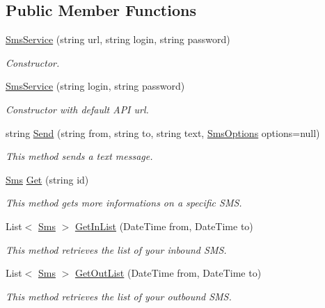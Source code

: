 \subsection*{Public Member Functions}
\begin{DoxyCompactItemize}
\item 
\hyperlink{class_thecallr_api_1_1_services_1_1_client_1_1_sms_service_a07f4ba5167b9fc91d173b3d600bdfe1a}{Sms\+Service} (string url, string login, string password)
\begin{DoxyCompactList}\small\item\em Constructor. \end{DoxyCompactList}\item 
\hyperlink{class_thecallr_api_1_1_services_1_1_client_1_1_sms_service_affcea6a4058f3282593b099529b6cf27}{Sms\+Service} (string login, string password)
\begin{DoxyCompactList}\small\item\em Constructor with default A\+P\+I url. \end{DoxyCompactList}\item 
string \hyperlink{class_thecallr_api_1_1_services_1_1_client_1_1_sms_service_ac6b2841312fb583b870d0581e430f9bc}{Send} (string from, string to, string text, \hyperlink{class_thecallr_api_1_1_objects_1_1_sms_1_1_sms_options}{Sms\+Options} options=null)
\begin{DoxyCompactList}\small\item\em This method sends a text message. \end{DoxyCompactList}\item 
\hyperlink{class_thecallr_api_1_1_objects_1_1_sms_1_1_sms}{Sms} \hyperlink{class_thecallr_api_1_1_services_1_1_client_1_1_sms_service_ae250c29e8143c86e1d7ed284c0234b84}{Get} (string id)
\begin{DoxyCompactList}\small\item\em This method gets more informations on a specific S\+M\+S. \end{DoxyCompactList}\item 
List$<$ \hyperlink{class_thecallr_api_1_1_objects_1_1_sms_1_1_sms}{Sms} $>$ \hyperlink{class_thecallr_api_1_1_services_1_1_client_1_1_sms_service_accf8d810353bcc318a2968368c56469b}{Get\+In\+List} (Date\+Time from, Date\+Time to)
\begin{DoxyCompactList}\small\item\em This method retrieves the list of your inbound S\+M\+S. \end{DoxyCompactList}\item 
List$<$ \hyperlink{class_thecallr_api_1_1_objects_1_1_sms_1_1_sms}{Sms} $>$ \hyperlink{class_thecallr_api_1_1_services_1_1_client_1_1_sms_service_afdcc1c18751da21afca9d57483036a56}{Get\+Out\+List} (Date\+Time from, Date\+Time to)
\begin{DoxyCompactList}\small\item\em This method retrieves the list of your outbound S\+M\+S. \end{DoxyCompactList}\end{DoxyCompactItemize}
